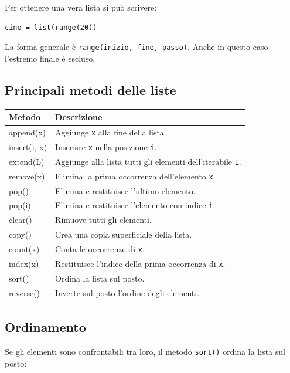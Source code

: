 \documentclass[11pt,a4paper]{book}
\begin{document}
Per ottenere una vera lista si può scrivere:

\begin{lstlisting}[style=python]
cino = list(range(20))
\end{lstlisting}

La forma generale è \texttt{range(inizio, fine, passo)}. Anche in questo caso l'estremo finale è escluso.

\subsection{Principali metodi delle liste}

\begin{center}
\renewcommand{\arraystretch}{1.2}
\begin{tabular}{>{\ttfamily}l p{9cm}}
\toprule
\normalfont Metodo & Descrizione \\
\midrule
append(x) & Aggiunge \texttt{x} alla fine della lista. \\
insert(i, x) & Inserisce \texttt{x} nella posizione \texttt{i}. \\
extend(L) & Aggiunge alla lista tutti gli elementi dell'iterabile \texttt{L}. \\
remove(x) & Elimina la prima occorrenza dell'elemento \texttt{x}. \\
pop() & Elimina e restituisce l'ultimo elemento. \\
pop(i) & Elimina e restituisce l'elemento con indice \texttt{i}. \\
clear() & Rimuove tutti gli elementi. \\
copy() & Crea una copia superficiale della lista. \\
count(x) & Conta le occorrenze di \texttt{x}. \\
index(x) & Restituisce l'indice della prima occorrenza di \texttt{x}. \\
sort() & Ordina la lista sul posto. \\
reverse() & Inverte sul posto l'ordine degli elementi. \\
\bottomrule
\end{tabular}
\end{center}

\subsection{Ordinamento}

Se gli elementi sono confrontabili tra loro, il metodo \texttt{sort()} ordina la lista sul posto:
\end{document}
